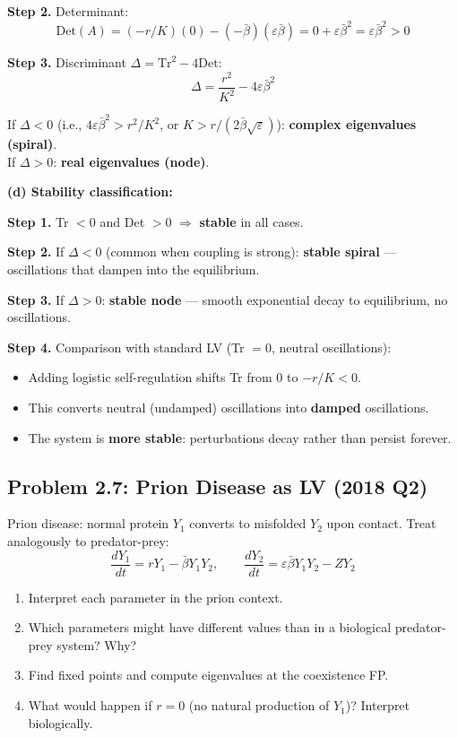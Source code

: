 \documentclass[10pt]{article}
\begin{document}
\begin{solution}
\textbf{Step 2.} Determinant:
\[
\text{Det}(A) = (-r/K)(0) - (-\bar\beta)(\varepsilon\bar\beta) = 0 + \varepsilon\bar\beta^2 = \varepsilon\bar\beta^2 > 0
\]

\textbf{Step 3.} Discriminant $\Delta = \text{Tr}^2 - 4\text{Det}$:
\[
\Delta = \frac{r^2}{K^2} - 4\varepsilon\bar\beta^2
\]

If $\Delta < 0$ (i.e., $4\varepsilon\bar\beta^2 > r^2/K^2$, or $K > r/(2\bar\beta\sqrt\varepsilon)$): \textbf{complex eigenvalues (spiral)}.\\
If $\Delta > 0$: \textbf{real eigenvalues (node)}.

\medskip\textbf{(d) Stability classification:}

\textbf{Step 1.} Tr $< 0$ and Det $> 0$ $\Rightarrow$ \textbf{stable} in all cases.

\textbf{Step 2.} If $\Delta < 0$ (common when coupling is strong): \textbf{stable spiral} — oscillations that dampen into the equilibrium.

\textbf{Step 3.} If $\Delta > 0$: \textbf{stable node} — smooth exponential decay to equilibrium, no oscillations.

\textbf{Step 4.} Comparison with standard LV (Tr $= 0$, neutral oscillations):
\begin{itemize}
\item Adding logistic self-regulation shifts Tr from 0 to $-r/K < 0$.
\item This converts neutral (undamped) oscillations into \textbf{damped} oscillations.
\item The system is \textbf{more stable}: perturbations decay rather than persist forever.
\end{itemize}
\end{solution}

\subsection{Problem 2.7: Prion Disease as LV (2018 Q2)}

\begin{problem}
Prion disease: normal protein $Y_1$ converts to misfolded $Y_2$ upon contact. Treat analogously to predator-prey:
\[
\frac{dY_1}{dt} = rY_1 - \bar\beta Y_1 Y_2, \qquad \frac{dY_2}{dt} = \varepsilon\bar\beta Y_1 Y_2 - Z Y_2
\]
\begin{enumerate}[label=(\alph*)]
\item Interpret each parameter in the prion context.
\item Which parameters might have different values than in a biological predator-prey system? Why?
\item Find fixed points and compute eigenvalues at the coexistence FP.
\item What would happen if $r = 0$ (no natural production of $Y_1$)? Interpret biologically.
\end{enumerate}
\end{problem}
\end{document}
